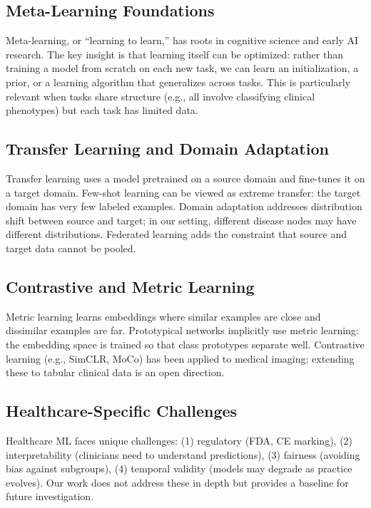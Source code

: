 \subsection{Meta-Learning Foundations}

Meta-learning, or ``learning to learn,'' has roots in cognitive science and early AI research. The key insight is that learning itself can be optimized: rather than training a model from scratch on each new task, we can learn an initialization, a prior, or a learning algorithm that generalizes across tasks. This is particularly relevant when tasks share structure (e.g., all involve classifying clinical phenotypes) but each task has limited data.

\subsection{Transfer Learning and Domain Adaptation}

Transfer learning uses a model pretrained on a source domain and fine-tunes it on a target domain. Few-shot learning can be viewed as extreme transfer: the target domain has very few labeled examples. Domain adaptation addresses distribution shift between source and target; in our setting, different disease nodes may have different distributions. Federated learning adds the constraint that source and target data cannot be pooled.

\subsection{Contrastive and Metric Learning}

Metric learning learns embeddings where similar examples are close and dissimilar examples are far. Prototypical networks implicitly use metric learning: the embedding space is trained so that class prototypes separate well. Contrastive learning (e.g., SimCLR, MoCo) has been applied to medical imaging; extending these to tabular clinical data is an open direction.

\subsection{Healthcare-Specific Challenges}

Healthcare ML faces unique challenges: (1) regulatory (FDA, CE marking), (2) interpretability (clinicians need to understand predictions), (3) fairness (avoiding bias against subgroups), (4) temporal validity (models may degrade as practice evolves). Our work does not address these in depth but provides a baseline for future investigation.

